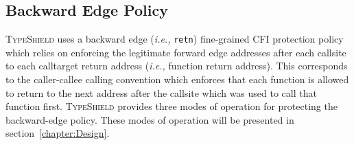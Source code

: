 \subsection{Backward Edge Policy}
\label{Backward Edge CFI Policy}
\textsc{TypeShield} uses a backward edge (\textit{i.e.,} \texttt{retn}) fine-grained CFI protection policy which 
relies on enforcing the legitimate forward edge addresses after each callsite
to each calltarget return address (\textit{i.e.,} function return address). 
This corresponds to the caller-callee calling convention 
which enforces that each function is allowed to return to the next address after the callsite which 
was used to call that function first. \textsc{TypeShield} provides three modes of operation for
protecting the backward-edge policy. 
These modes of operation will be presented in section~\cref{chapter:Design}.

